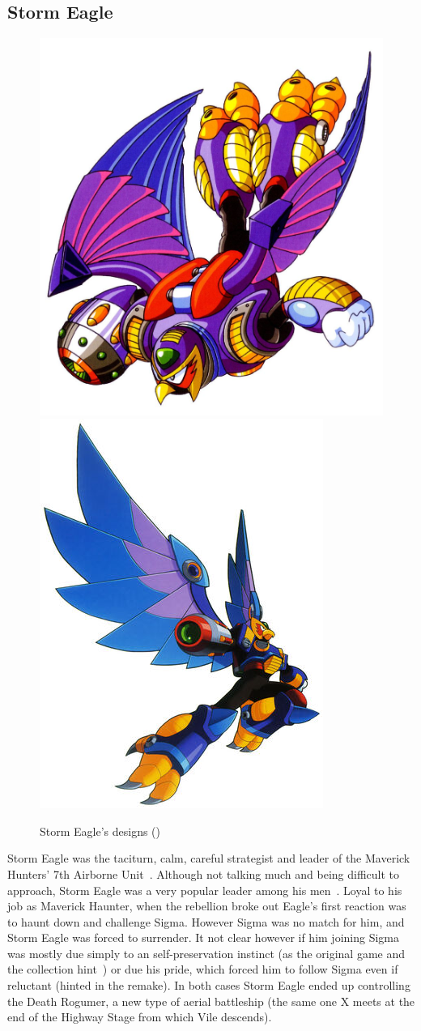  \subsection{Storm Eagle}\label{boss:Storm_Eagle}
 \begin{figure}[htp]
 	\centering
 	\includegraphics[width=0.4\linewidth]{figures/X1/Storm_eagle/Storm_Eagle.jpg}
 	\includegraphics[width=0.4\linewidth]{figures/X1/Storm_eagle/MHXStormEagle.jpg}
 	\caption{Storm Eagle's designs (\cite{book:MMX_Complete_art})}
 \end{figure}
 Storm Eagle was the taciturn, calm, careful strategist and leader of the Maverick Hunters' 7th Airborne Unit~\cite{wiki:Storm_eagle}. Although not talking much and being difficult to approach, Storm Eagle was a very popular leader among his men~\cite{MHX:manual}. Loyal to his job as Maverick Haunter, when the rebellion broke out Eagle's first reaction was to haunt down and challenge Sigma. However Sigma was no match for him, and Storm Eagle was forced to surrender. It not clear however if him joining Sigma was mostly due simply to an self-preservation instinct (as the original game and the collection hint~\cite{Xcoll1:Manual_X1}) or due his pride, which forced him to follow Sigma even if reluctant (hinted in the remake). In both cases Storm Eagle ended up controlling the Death Rogumer, a new type of aerial battleship (the same one X meets at the end of the Highway Stage from which Vile descends).
 
